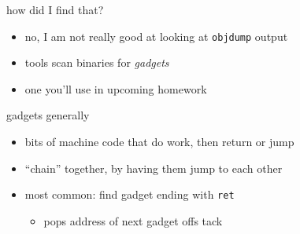 
\begin{frame}{how did I find that?}
    \begin{itemize}
        \item no, I am not really good at looking at \texttt{objdump} output
        \item tools scan binaries for \textit{gadgets}
        \item one you'll use in upcoming homework
    \end{itemize}
\end{frame}

\begin{frame}{gadgets generally}
    \begin{itemize}
        \item bits of machine code that do work, then return or jump
        \item ``chain'' together, by having them jump to each other
        \item most common: find gadget ending with \texttt{ret}
            \begin{itemize}
            \item pops address of next gadget offs tack
            \end{itemize}
    \end{itemize}
\end{frame}


